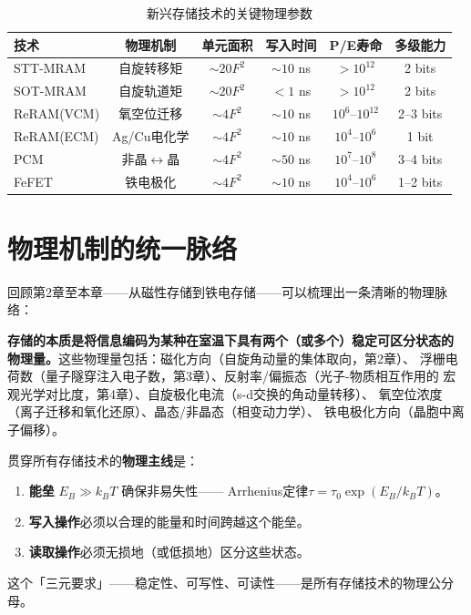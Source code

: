 \documentclass[11pt,a4paper,openany]{book}
\theoremstyle{definition}
\theoremstyle{plain}
\theoremstyle{remark}
\begin{document}
\begin{table}[H]
\centering
\caption{新兴存储技术的关键物理参数}
\begin{tabular}{@{}lccccc@{}}
\toprule
技术 & 物理机制 & 单元面积 & 写入时间 & P/E寿命 & 多级能力 \\
\midrule
STT-MRAM & 自旋转移矩 & $\sim 20F^2$ & $\sim 10$ ns & $>10^{12}$ & 2 bits \\
SOT-MRAM & 自旋轨道矩 & $\sim 20F^2$ & $<1$ ns & $>10^{12}$ & 2 bits \\
ReRAM(VCM) & 氧空位迁移 & $\sim 4F^2$ & $\sim 10$ ns & $10^6$--$10^{12}$ & 2--3 bits \\
ReRAM(ECM) & Ag/Cu电化学 & $\sim 4F^2$ & $\sim 10$ ns & $10^4$--$10^6$ & 1 bit \\
PCM & 非晶$\leftrightarrow$晶 & $\sim 4F^2$ & $\sim 50$ ns & $10^7$--$10^8$ & 3--4 bits \\
FeFET & 铁电极化 & $\sim 4F^2$ & $\sim 10$ ns & $10^4$--$10^6$ & 1--2 bits \\
\bottomrule
\end{tabular}
\end{table}

\section{物理机制的统一脉络}

回顾第2章至本章——从磁性存储到铁电存储——可以梳理出一条清晰的物理脉络：

\textbf{存储的本质是将信息编码为某种在室温下具有两个（或多个）稳定可区分状态的
物理量。}这些物理量包括：磁化方向（自旋角动量的集体取向，第2章）、
浮栅电荷数（量子隧穿注入电子数，第3章）、反射率/偏振态（光子-物质相互作用的
宏观光学对比度，第4章）、自旋极化电流（s-d交换的角动量转移）、
氧空位浓度（离子迁移和氧化还原）、晶态/非晶态（相变动力学）、
铁电极化方向（晶胞中离子偏移）。

贯穿所有存储技术的\textbf{物理主线}是：
\begin{enumerate}
  \item \textbf{能垒} $E_B \gg k_B T$ 确保非易失性——
  Arrhenius定律$\tau = \tau_0\exp(E_B/k_B T)$。
  \item \textbf{写入操作}必须以合理的能量和时间跨越这个能垒。
  \item \textbf{读取操作}必须无损地（或低损地）区分这些状态。
\end{enumerate}

这个「三元要求」——稳定性、可写性、可读性——是所有存储技术的物理公分母。

\end{document}
